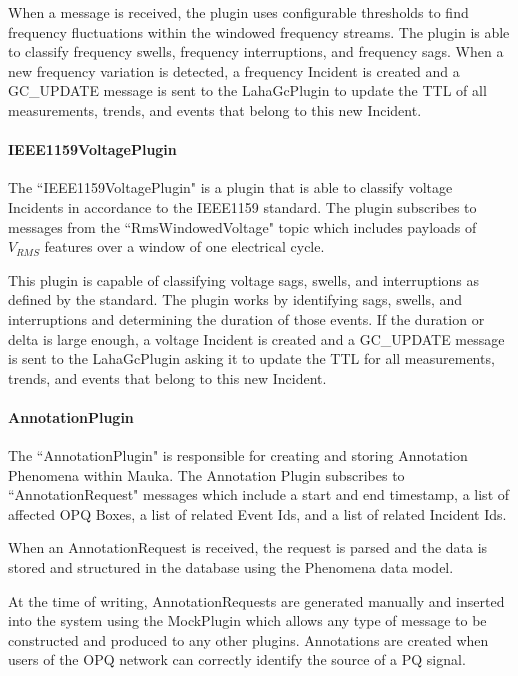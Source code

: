 When a message is received, the plugin uses configurable thresholds to find frequency fluctuations within the windowed frequency streams. The plugin is able to classify frequency swells, frequency interruptions, and frequency sags. When a new frequency variation is detected, a frequency Incident is created and a GC\_UPDATE message is sent to the LahaGcPlugin to update the TTL of all measurements, trends, and events that belong to this new Incident.

\paragraph{IEEE1159VoltagePlugin}
The ``IEEE1159VoltagePlugin" is a plugin that is able to classify voltage Incidents in accordance to the IEEE1159 standard\cite{IEEE:2018:1159D3}. The plugin subscribes to messages from the ``RmsWindowedVoltage" topic which includes payloads of $V_{RMS}$ features over a window of one electrical cycle.

This plugin is capable of classifying voltage sags, swells, and interruptions as defined by the standard. The plugin works by identifying sags, swells, and interruptions and determining the duration of those events. If the duration or delta is large enough, a voltage Incident is created and a GC\_UPDATE message is sent to the LahaGcPlugin asking it to update the TTL for all measurements, trends, and events that belong to this new Incident.

\paragraph{AnnotationPlugin}

The ``AnnotationPlugin" is responsible for creating and storing Annotation Phenomena within Mauka. The Annotation Plugin subscribes to ``AnnotationRequest" messages which include a start and end timestamp, a list of affected OPQ Boxes, a list of related Event Ids, and a list of related Incident Ids.

When an AnnotationRequest is received, the request is parsed and the data is stored and structured in the database using the Phenomena data model.

At the time of writing, AnnotationRequests are generated manually and inserted into the system using the MockPlugin which allows any type of message to be constructed and produced to any other plugins. Annotations are created when users of the OPQ network can correctly identify the source of a PQ signal.

